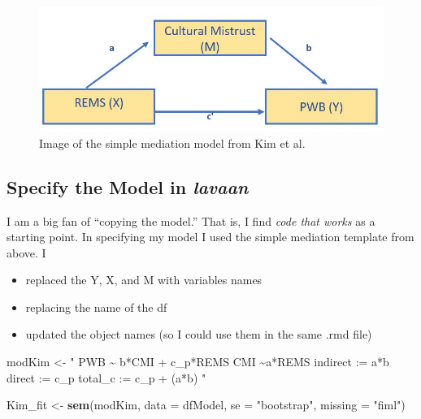 \documentclass[
  11pt,
]{book}
\newenvironment{Shaded}{\begin{snugshade}}{\end{snugshade}}
\newcommand{\AttributeTok}[1]{\textcolor[rgb]{0.27,0.27,0.27}{#1}}
\newcommand{\FunctionTok}[1]{\textcolor[rgb]{0.27,0.27,0.27}{\textbf{#1}}}
\newcommand{\NormalTok}[1]{#1}
\newcommand{\OtherTok}[1]{\textcolor[rgb]{0.37,0.37,0.37}{#1}}
\newcommand{\StringTok}[1]{\textcolor[rgb]{0.5,0.5,0.5}{#1}}
\providecommand{\tightlist}{%
  \setlength{\itemsep}{0pt}\setlength{\parskip}{0pt}}
\begin{document}
\begin{figure}
\centering
\includegraphics{images/SimpleMed/Kim_SimpMed.jpg}
\caption{Image of the simple mediation model from Kim et al.}
\end{figure}

\hypertarget{specify-the-model-in-lavaan}{%
\subsection{\texorpdfstring{Specify the Model in \emph{lavaan}}{Specify the Model in lavaan}}\label{specify-the-model-in-lavaan}}

I am a big fan of ``copying the model.'' That is, I find \emph{code that works} as a starting point. In specifying my model I used the simple mediation template from above. I

\begin{itemize}
\tightlist
\item
  replaced the Y, X, and M with variables names
\item
  replacing the name of the df
\item
  updated the object names (so I could use them in the same .rmd file)
\end{itemize}

\begin{Shaded}
\begin{Highlighting}[]
\NormalTok{modKim }\OtherTok{\textless{}{-}} \StringTok{"}
\StringTok{          PWB \textasciitilde{} b*CMI + c\_p*REMS }
\StringTok{          CMI \textasciitilde{}a*REMS}
\StringTok{          }
\StringTok{          indirect :=  a*b}
\StringTok{          direct  := c\_p}
\StringTok{          total\_c  := c\_p + (a*b)}
\StringTok{          "}
\end{Highlighting}
\end{Shaded}

\begin{Shaded}
\begin{Highlighting}[]
\NormalTok{Kim\_fit }\OtherTok{\textless{}{-}} \FunctionTok{sem}\NormalTok{(modKim, }\AttributeTok{data =}\NormalTok{ dfModel, }\AttributeTok{se =} \StringTok{"bootstrap"}\NormalTok{, }\AttributeTok{missing =} \StringTok{"fiml"}\NormalTok{)}
\end{Highlighting}
\end{Shaded}
\end{document}

